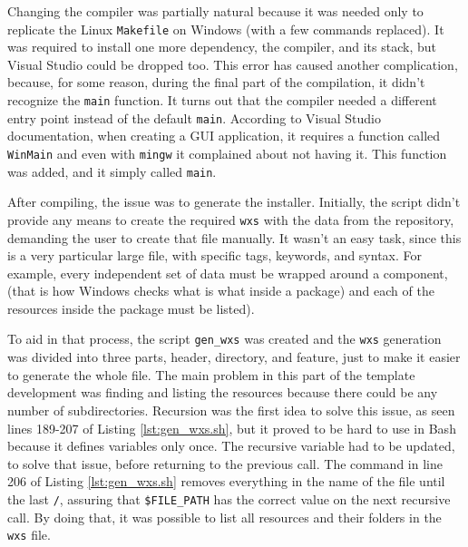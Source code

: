 Changing the compiler was partially natural because it was needed only to replicate the Linux \texttt{Makefile} on Windows (with a few commands replaced). It was required to install one more dependency, the compiler, and its stack, but Visual Studio could be dropped too. This error has caused another complication, because, for some reason, during the final part of the compilation, it didn't recognize the \texttt{main} function. It turns out that the compiler needed a different entry point instead of the default \texttt{main}. According to Visual Studio documentation, when creating a GUI application, it requires a function called \texttt{WinMain} \cite{visualstudio2017entrypoint} and even with \texttt{mingw} it complained about not having it. This function was added, and it simply called \texttt{main}.

After compiling, the issue was to generate the installer. Initially, the script didn't provide any means to create the required \texttt{wxs} with the data from the repository, demanding the user to create that file manually. It wasn't an easy task, since this is a very particular large file, with specific tags, keywords, and syntax. For example, every independent set of data must be wrapped around a component, (that is how Windows checks what is what inside a package) and each of the resources inside the package must be listed).

To aid in that process, the script \texttt{gen\_wxs} was created and the \texttt{wxs} generation was divided into three parts, header, directory, and feature, just to make it easier to generate the whole file. The main problem in this part of the template development was finding and listing the resources because there could be any number of subdirectories. Recursion was the first idea to solve this issue, as seen lines 189-207 of Listing \ref{lst:gen_wxs.sh}, but it proved to be hard to use in Bash because it defines variables only once. The recursive variable had to be updated, to solve that issue, before returning to the previous call. The command in line 206 of Listing \ref{lst:gen_wxs.sh} removes everything in the name of the file until the last \texttt{/}, assuring that \texttt{\$FILE\_PATH} has the correct value on the next recursive call. By doing that, it was possible to list all resources and their folders in the \texttt{wxs} file.




